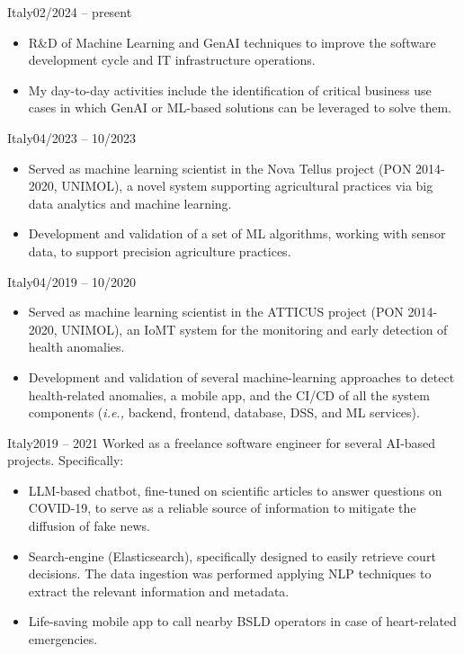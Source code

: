 
	{Italy}{02/2024 – present}
	\begin{itemize}
		\item R\&D of Machine Learning and GenAI techniques to improve the software development cycle and IT infrastructure operations.
		\item My day-to-day activities include the identification of critical business use cases in which GenAI or ML-based solutions can be leveraged to solve them.
	\end{itemize}
		
	\medskip

	{Italy}{04/2023 – 10/2023}
	\begin{itemize}
            \item Served as machine learning scientist in the Nova Tellus project (PON 2014-2020, UNIMOL), a novel system supporting agricultural practices via big data analytics and machine learning.
            \item Development and validation of a set of ML algorithms, working with sensor data, to support precision agriculture practices.
	\end{itemize}
	
	\medskip
	
	{Italy}{04/2019 – 10/2020}
	\begin{itemize}
		\item Served as machine learning scientist in the ATTICUS project (PON 2014-2020, UNIMOL), an IoMT system for the monitoring and early detection of health anomalies.
		\item Development and validation of several machine-learning approaches to detect health-related anomalies, a mobile app, and the CI/CD of all the system components (\emph{i.e.,} backend, frontend, database, DSS, and ML services).
	\end{itemize}

	\medskip

	{Italy}{2019 – 2021}
	Worked as a freelance software engineer for several AI-based projects. Specifically:

	\begin{itemize}

		\item LLM-based chatbot, fine-tuned on scientific articles to answer questions on COVID-19, to serve as a reliable source of information to mitigate the diffusion of fake news.
		
		\item Search-engine (Elasticsearch), specifically designed to easily retrieve court decisions. The data ingestion was performed applying NLP techniques to extract the relevant information and metadata.
		
		\item Life-saving mobile app to call nearby BSLD operators in case of heart-related emergencies.
		
	\end{itemize}